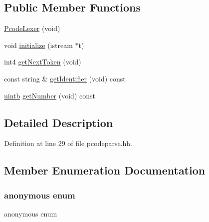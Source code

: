 \subsection*{Public Member Functions}
\begin{DoxyCompactItemize}
\item 
\mbox{\hyperlink{class_pcode_lexer_afce04ac31d99b2ba993a2a3c32b308f9}{Pcode\+Lexer}} (void)
\item 
void \mbox{\hyperlink{class_pcode_lexer_a2c12526239c45121850c81103a322170}{initialize}} (istream $\ast$t)
\item 
int4 \mbox{\hyperlink{class_pcode_lexer_a0a7d18fad0500a7c54502cac6c84b9f8}{get\+Next\+Token}} (void)
\item 
const string \& \mbox{\hyperlink{class_pcode_lexer_a07f31b29b86205a4536fdc4e1ac22194}{get\+Identifier}} (void) const
\item 
\mbox{\hyperlink{types_8h_a2db313c5d32a12b01d26ac9b3bca178f}{uintb}} \mbox{\hyperlink{class_pcode_lexer_a09318b61d5248314ed73e78357aa4fd3}{get\+Number}} (void) const
\end{DoxyCompactItemize}


\subsection{Detailed Description}


Definition at line 29 of file pcodeparse.\+hh.



\subsection{Member Enumeration Documentation}
\mbox{\label{class_pcode_lexer_a4f521efac3b64a1925adaac3a4a952f3}} 
\subsubsection{\texorpdfstring{anonymous enum}{anonymous enum}}
{\footnotesize\ttfamily anonymous enum}

